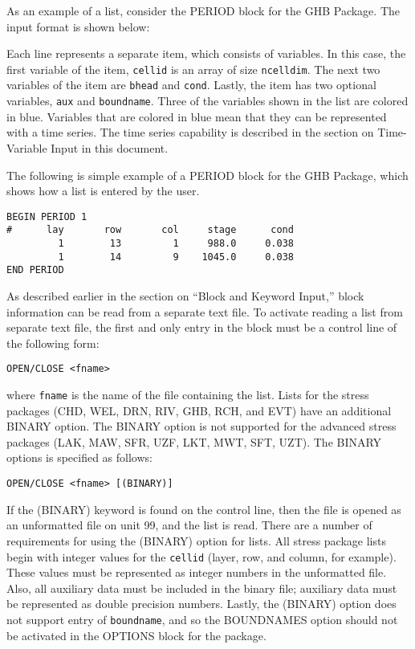 As an example of a list, consider the PERIOD block for the GHB Package.  The input format is  shown below:



Each line represents a separate item, which consists of variables.  In this case, the first variable of the item, \texttt{cellid} is an array of size \texttt{ncelldim}.  The next two variables of the item are \texttt{bhead} and \texttt{cond}.  Lastly, the item has two optional variables, \texttt{aux} and \texttt{boundname}.  Three of the variables shown in the list are colored in blue.  Variables that are colored in blue mean that they can be represented with a time series.  The time series capability is described in the section on Time-Variable Input in this document.  

The following is simple example of a PERIOD block for the GHB Package, which shows how a list is entered by the user.

\begin{lstlisting}[style=inputfile]
BEGIN PERIOD 1
#      lay       row       col     stage      cond
         1        13         1     988.0     0.038
         1        14         9    1045.0     0.038
END PERIOD
\end{lstlisting}

As described earlier in the section on ``Block and Keyword Input,'' block information can be read from a separate text file.  To activate reading a list from separate text file, the first and only entry in the block must be a control line of the following form:  

\begin{lstlisting}[style=blockdefinition]
  OPEN/CLOSE <fname>
\end{lstlisting}

\noindent where \texttt{fname} is the name of the file containing the list.  Lists for the stress packages (CHD, WEL, DRN, RIV, GHB, RCH, and EVT) have an additional BINARY option.  The BINARY  option is not supported for the advanced stress packages (LAK, MAW, SFR, UZF, LKT, MWT, SFT, UZT).  The BINARY options is specified as follows:

\begin{lstlisting}[style=blockdefinition]
  OPEN/CLOSE <fname> [(BINARY)]
\end{lstlisting}

If the (BINARY) keyword is found on the control line, then the file is opened as an unformatted file on unit 99, and the list is read.  There are a number of requirements for using the (BINARY) option for lists.  All stress package lists begin with integer values for the \texttt{cellid} (layer, row, and column, for example).  These values must be represented as integer numbers in the unformatted file.  Also, all auxiliary data must be included in the binary file; auxiliary data must be represented as double precision numbers.  Lastly, the (BINARY) option does not support entry of \texttt{boundname}, and so the BOUNDNAMES option should not be activated in the OPTIONS block for the package.  